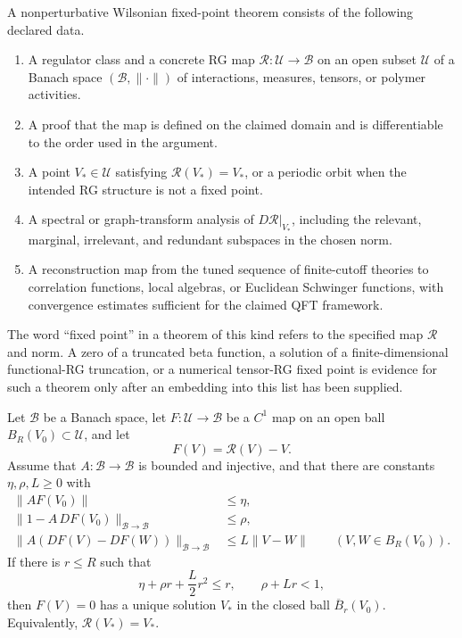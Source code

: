 \begin{definition}
\label{def:theorem-level-nonperturbative-rg-fixed-point}
A nonperturbative Wilsonian fixed-point theorem consists of the following
declared data.
\begin{enumerate}
  \item A regulator class and a concrete RG map
  \(\mathcal R:\mathcal U\to\mathcal B\) on an open subset
  \(\mathcal U\) of a Banach space \((\mathcal B,\|\cdot\|)\) of
  interactions, measures, tensors, or polymer activities.
  \item A proof that the map is defined on the claimed domain and is
  differentiable to the order used in the argument.
  \item A point \(V_\ast\in\mathcal U\) satisfying
  \(\mathcal R(V_\ast)=V_\ast\), or a periodic orbit when the intended RG
  structure is not a fixed point.
  \item A spectral or graph-transform analysis of
  \(D\mathcal R|_{V_\ast}\), including the relevant, marginal, irrelevant, and
  redundant subspaces in the chosen norm.
  \item A reconstruction map from the tuned sequence of finite-cutoff
  theories to correlation functions, local algebras, or Euclidean
  Schwinger functions, with convergence estimates sufficient for the claimed
  QFT framework.
\end{enumerate}
The word ``fixed point'' in a theorem of this kind refers to the specified
map \(\mathcal R\) and norm.  A zero of a truncated beta function, a solution
of a finite-dimensional functional-RG truncation, or a numerical tensor-RG
fixed point is evidence for such a theorem only after an embedding into this
list has been supplied.
\end{definition}

\begin{theorem}
\label{thm:newton-kantorovich-rg-fixed-point}
Let \(\mathcal B\) be a Banach space, let \(F:\mathcal U\to\mathcal B\) be a
\(C^1\) map on an open ball \(B_R(V_0)\subset\mathcal U\), and let
\[
  F(V)=\mathcal R(V)-V .
\]
Assume that \(A:\mathcal B\to\mathcal B\) is bounded and injective, and that
there are constants \(\eta,\rho,L\geq0\) with
\begin{align}
  \|A F(V_0)\|&\leq \eta, \label{eq:nk-residual-bound}\\
  \|1-A\,DF(V_0)\|_{\mathcal B\to\mathcal B}&\leq \rho,\\
  \|A(DF(V)-DF(W))\|_{\mathcal B\to\mathcal B}
     &\leq L\|V-W\|
       \qquad (V,W\in B_R(V_0)).
       \label{eq:nk-lipschitz-bound}
\end{align}
If there is \(r\leq R\) such that
\begin{equation}
  \eta+\rho r+\frac{L}{2}r^2\leq r,
  \qquad
  \rho+Lr<1,
  \label{eq:nk-ball-condition}
\end{equation}
then \(F(V)=0\) has a unique solution \(V_\ast\) in the closed ball
\(\overline B_r(V_0)\).  Equivalently, \(\mathcal R(V_\ast)=V_\ast\).
\end{theorem}

